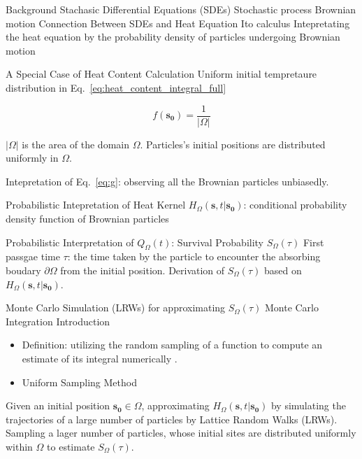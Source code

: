\documentclass{article}
\begin{document}
\begin{outline}[enumerate]
    \2 Background \cite{jacobs2010stochastic}
      \3 Stachasic Differential Equations (SDEs)
        \4 Stochastic process
        \4 Brownian motion
      \3 Connection Between SDEs and Heat Equation 
        \4 Ito calculus
        \4 Intepretating the heat equation by the probability density of particles undergoing Brownian motion


    \2 A Special Case of Heat Content Calculation  
      \3 Uniform initial tempretaure distribution in Eq.~\ref{eq:heat_content_integral_full}
          \par
          \begin{equation}\label{eq:uniform_initial_condition}
             f(\bm{s_0}) = \frac{1}{|\Omega|} 
          \end{equation}
          
           \4 $|\Omega|$ is the area of the domain $\Omega$.
           \4 Particles's initial positions are distributed uniformly in $\Omega$.
          
      \3 Intepretation of Eq.~\ref{eq:g}: observing all the Brownian particles unbiasedly.
           
      \3 Probabilistic Intepretation of Heat Kernel $H_{\Omega}(\bm{s}, t | \bm{s_0})$: conditional probability density function of Brownian particles

      \3 Probabilistic Interpretation of $Q_{\Omega}(t)$: Survival Probability $S_{\Omega}(\tau)$
         \4 First passgae time $\tau$: the time taken by the particle to encounter the absorbing boudary $\partial \Omega$ from the initial position.
         \4 Derivation of $S_{\Omega}(\tau)$ based on $H_{\Omega}(\bm{s}, t | \bm{s_0})$.
        

         
    \2 Monte Carlo Simulation (LRWs) for approximating $S_{\Omega}(\tau)$
      \3 Monte Carlo Integration
        \4 Introduction
          \begin{itemize}
            \item Definition: utilizing the random sampling of a function to compute an estimate of its integral numerically \cite{hammersley1960monte}.
            \item Uniform Sampling Method
          \end{itemize}
       \4 Given an initial position $\bm{s_0} \in \Omega$, approximating $H_{\Omega}(\bm{s}, t | \bm{s_0})$ by simulating the trajectories of a large number of particles by Lattice Random Walks (LRWs).
       \4 Sampling a lager number of particles, whose initial sites are distributed uniformly within $\Omega$ to estimate $S_{\Omega}(\tau)$.
          

\end{outline}
\end{document}
